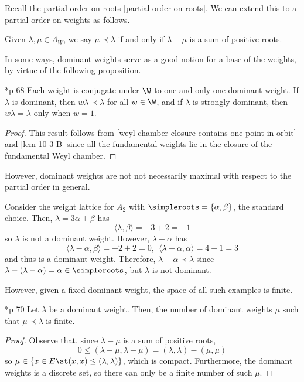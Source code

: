 \documentclass[11pt,leqno,oneside]{amsart}
\numberwithin{thm}{section}
\newcommand{\weightlattice}{\Lambda_W}
\begin{document}
Recall the
partial order on roots \ref{partial-order-on-roots}. We can extend
this to a partial order on weights as follows.
\begin{defn}
  Given \(\lambda,\mu \in \weightlattice\), we say \(\mu \prec
  \lambda\) if and only if \(\lambda-\mu\) is a sum of positive roots.
\end{defn}
In some ways, dominant weights serve as a good notion for a base of
the weights, by virtue of the following proposition.
\begin{prop}\label{weight-is-conj-to-unique-dominant-weight}
  \cite{humph}*{p 68} Each weight is conjugate under \(\W\) to one and
  only one dominant weight. If \(\lambda\) is dominant, then \(w
  \lambda \prec \lambda\) for all \(w \in \W\), and if
  \(\lambda\) is strongly dominant, then \(w \lambda = \lambda\)
  only when \(w = 1\).
\end{prop}
\begin{proof}
  This result follows from
  \ref{weyl-chamber-closure-contains-one-point-in-orbit} and
  \ref{lem-10-3-B} since all the fundamental weights lie in the
  closure of the fundamental Weyl chamber.
\end{proof}
However, dominant weights are not not necessarily maximal with respect
to the partial order in general.
\begin{example}
  Consider the weight lattice for \(A_2\) with
  \(\simpleroots=\{\alpha,\beta\}\), the standard choice. Then,
  \(\lambda = 3\alpha+\beta\) has \[
    \langle \lambda, \beta \rangle = -3+2 = -1
  \]
  so \(\lambda\) is not a dominant weight. However, \(\lambda-\alpha\)
  has \[
    \langle \lambda-\alpha, \beta \rangle = -2+2=0, \ \ \langle
    \lambda-\alpha, \alpha \rangle = 4-1 = 3
  \]
  and thus is a dominant weight. Therefore, \(\lambda-\alpha \prec
  \lambda\) since \(\lambda - (\lambda-\alpha) = \alpha \in
  \simpleroots\), but \(\lambda\) is not dominant.
\end{example}
However, given a fixed dominant weight, the space of all such examples
is finite.
\begin{lem}\label{finite-num-of-misbehaved-weights}
  \cite{humph}*{p 70} Let \(\lambda\) be a dominant weight. Then, the
  number of dominant 
  weights \(\mu\) such that \(\mu \prec \lambda\) is finite.
\end{lem}
\begin{proof}
  Observe that, since \(\lambda-\mu\) is a sum of positive roots, \[
    0 \leq (\lambda+\mu, \lambda-\mu) = (\lambda,\lambda)-(\mu,\mu)
  \]
  so \(\mu \in \{x \in E \st (x,x) \leq (\lambda,\lambda)\}\), which
  is compact. Furthermore, the dominant weights is a discrete set, so
  there can only be a finite number of such \(\mu\).
\end{proof}
\end{document}
